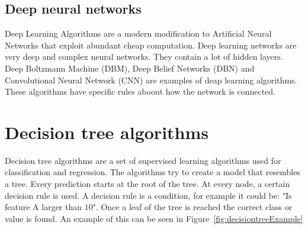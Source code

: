 \subsection{Deep neural networks}
Deep Learning Algorithms are a modern modification to Artificial Neural Networks that exploit abundant cheap computation. Deep learning networks are very deep and complex neural networks. They contain a lot of hidden layers. Deep Boltzmann Machine (DBM), Deep Belief Networks (DBN) and Convolutional Neural Network (CNN) are examples of deap learning algorithms. These algorithms have specific rules aboout how the network is connected. \cite{Goodfellow-et-al-2016-Book}

\section{Decision tree algorithms}
\label{decisiontree}
Decision tree algorithms are a set of supervised learning algorithms used for classification and regression. The algorithms try to create a model that resembles a tree. Every prediction starts at the root of the tree. At every node, a certain decision rule is used. A decision rule is a condition, for example it could be: "Is feature A larger than $10$". Once a leaf of the tree is reached the correct class or value is found. \cite{decisiontree} An example of this can be seen in Figure~\ref{fig:decisiontreeExample} \\\\

